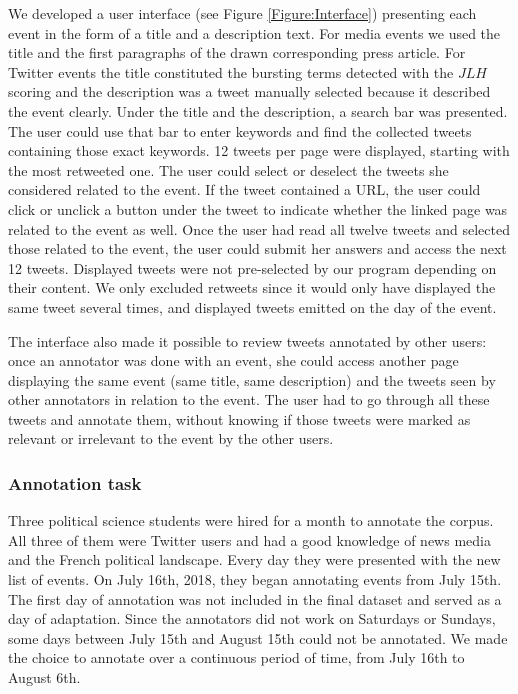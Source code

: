 We developed a user interface (see Figure \ref{Figure:Interface}) presenting each event in the form of a title and a description text. For media events we used the title and the first paragraphs of the drawn corresponding press article. For Twitter events the title constituted the bursting terms detected with the $JLH$ scoring and the description was a tweet manually selected because it described the event clearly. Under the title and the description, a search bar was presented. The user could use that bar to enter keywords and find the collected tweets containing those exact keywords. 12 tweets per page were displayed, starting with the most retweeted one. The user could select or deselect the tweets she considered related to the event. If the tweet contained a URL, the user could click or unclick a button under the tweet to indicate whether the linked page was related to the event as well. Once the user had read all twelve tweets and selected those related to the event, the user could submit her answers and access the next 12 tweets. Displayed tweets were not pre-selected by our program depending on their content. We only excluded retweets since it would only have displayed the same tweet several times, and displayed tweets emitted on the day of the event. 


The interface also made it possible to review tweets annotated by other users: once an annotator was done with an event, she could access another page displaying the same event (same title, same description) and the tweets seen by other annotators in relation to the event. The user had to go through all these tweets and annotate them, without knowing if those tweets were marked as relevant or irrelevant to the event by the other users.

		\subsubsection{Annotation task}
	Three political science students were hired for a month to annotate the corpus. All three of them were Twitter users and had a good knowledge of news media and the French political landscape. Every day they were presented with the new list of events. On July 16th, 2018, they began annotating events from July 15th. The first day of annotation was not included in the final dataset and served as a day of adaptation. Since the annotators did not work on Saturdays or Sundays, some days between July 15th and August 15th could not be annotated. We made the choice to annotate over a continuous period of time, from July 16th to August 6th.


